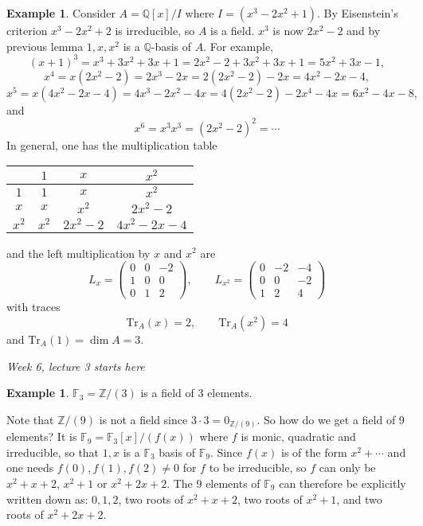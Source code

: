 \documentclass[a4paper]{article}
\newcommand{\Tr}{\text{Tr}}
\newcommand{\F}{\mathbb{F}}
\newcommand{\Z}{\mathbb{Z}}
\newcommand{\Q}{\mathbb{Q}}
\theoremstyle{definition}
\newtheorem{example}[defn]{Example}
\begin{document}
\begin{example}
Consider $A=\Q[x]/I$ where $I=(x^3-2x^2+1)$. By Eisenstein's criterion $x^3-2x^2+2$ is irreducible, so $A$ is a field. $x^3$ is now $2x^2-2$ and by previous lemma $1,x,x^2$ is a $\Q$-basis of $A$. For example,
\[
(x+1)^3=x^3+3x^2+3x+1=2x^2-2+3x^2+3x+1=5x^2+3x-1,
\]
\[
x^4=x(2x^2-2)=2x^3-2x=2(2x^2-2)-2x=4x^2-2x-4,
\]
\[
x^5=x(4x^2-2x-4)=4x^3-2x^2-4x=4(2x^2-2)-2x^4-4x=6x^2-4x-8,
\]
and
\[
x^6=x^3x^3=(2x^2-2)^2=\cdots
\]
In general, one has the multiplication table

\begin{table}[H]
\centering
\begin{tabular}{c|ccc}
      & $1$   & $x$      & $x^2$       \\ \hline
$1$   & $1$   & $x$      & $x^2$       \\
$x$   & $x$   & $x^2$    & $2x^2-2$    \\
$x^2$ & $x^2$ & $2x^2-2$ & $4x^2-2x-4$
\end{tabular}
\end{table}
\end{example}

and the left multiplication by $x$ and $x^2$ are
\[
L_x=\begin{pmatrix}
0&0&-2\\1&0&0\\0&1&2
\end{pmatrix},\qquad
L_{x^2}=\begin{pmatrix}
0&-2&-4\\0&0&-2\\1&2&4
\end{pmatrix}
\]
with traces
\[
\Tr_A(x)=2,\qquad \Tr_A(x^2)=4
\]
and $\Tr_A(1)=\dim A=3$.

\begin{flushright}
\textit{Week 6, lecture 3 starts here}
\end{flushright}

\begin{example}
$\F_3=\Z/(3)$ is a field of 3 elements.

Note that $\Z/(9)$ is not a field since $3\cdot 3=0_{\Z/(9)}$. So how do we get a field of 9 elements? It is $\F_9=\F_3[x]/(f(x))$ where $f$ is monic, quadratic and irreducible, so that $1,x$ is a $\F_3$ basis of $\F_9$. Since $f(x)$ is of the form $x^2+\cdots$ and one needs $f(0),f(1),f(2)\neq 0$ for $f$ to be irreducible, so $f$ can only be $x^2+x+2$, $x^2+1$ or $x^2+2x+2$. The 9 elements of $\F_9$ can therefore be explicitly written down as: $0,1,2$, two roots of $x^2+x+2$, two roots of $x^2+1$, and two roots of $x^2+2x+2$.
\end{example}
\end{document}
